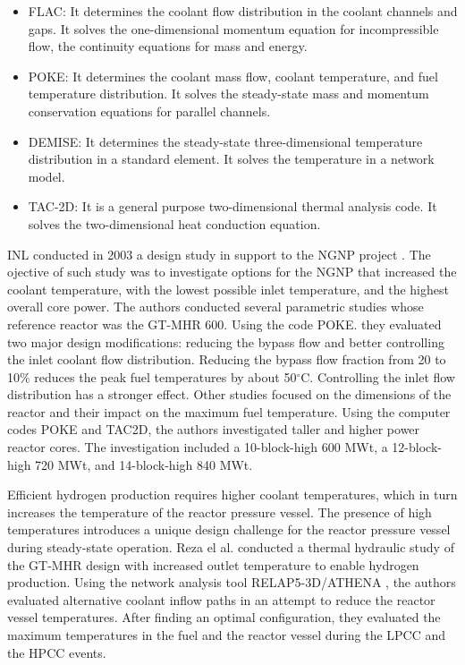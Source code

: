 \documentclass[11pt,letterpaper]{article}
\begin{document}
\begin{itemize}
\item FLAC: It determines the coolant flow distribution in the coolant channels and gaps.
It solves the one-dimensional momentum equation for incompressible flow, the continuity equations for mass and energy.

\item POKE: It determines the coolant mass flow, coolant temperature, and fuel temperature distribution.
It solves the steady-state mass and momentum conservation equations for parallel channels.

\item DEMISE: It determines the steady-state three-dimensional temperature distribution in a standard element.
It solves the temperature in a network model.

\item TAC-2D: It is a general purpose two-dimensional thermal analysis code.
It solves the two-dimensional heat conduction equation.
\end{itemize}

\gls{INL} conducted in 2003 a design study in support to the \gls{NGNP} project \cite{macdonald_ngnp_2003}.
The ojective of such study was to investigate options for the NGNP that increased the coolant temperature, with the lowest possible inlet temperature, and the highest overall core power.
The authors conducted several parametric studies whose reference reactor was the GT-MHR 600.
Using the code POKE. they evaluated two major design modifications: reducing the bypass flow and better controlling the inlet coolant flow distribution.
Reducing the bypass flow fraction from 20 to 10$\%$ reduces the peak fuel temperatures by about 50$^{\circ}$C.
Controlling the inlet flow distribution has a stronger effect.
Other studies focused on the dimensions of the reactor and their impact on the maximum fuel temperature.
Using the computer codes POKE and TAC2D, the authors investigated taller and higher power reactor cores.
The investigation included a 10-block-high 600 MWt, a 12-block-high 720 MWt, and 14-block-high 840 MWt.

Efficient hydrogen production requires higher coolant temperatures, which in turn increases the temperature of the reactor pressure vessel.
The presence of high temperatures introduces a unique design challenge for the reactor pressure vessel during steady-state operation.
Reza el al. \cite{reza_design_2006} conducted a thermal hydraulic study of the GT-MHR design with increased outlet temperature to enable hydrogen production.
Using the network analysis tool RELAP5-3D/ATHENA \cite{inl_relap5-3dathena_2005}, the authors evaluated alternative coolant inflow paths in an attempt to reduce the reactor vessel temperatures.
After finding an optimal configuration, they evaluated the maximum temperatures in the fuel and the reactor vessel during the \gls{LPCC} and the \gls{HPCC} events.
\end{document}
